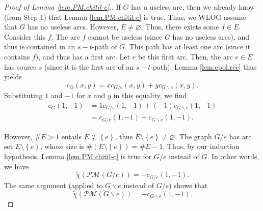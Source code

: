 \documentclass[12pt]{amsart}
\theoremstyle{definition}
\newcommand{\Pm}[1]{\mathcal{PM}\left(#1\right)}
\begin{document}
\begin{proof}[Proof of Lemma \ref{lem.PM.chitil-c}.]
If $G$ has a useless arc, then we already know (from Step 1) that Lemma
\ref{lem.PM.chitil-c} is true. Thus, we WLOG assume that $G$ has no useless
arcs. However, $E\neq\varnothing$. Thus, there exists some $f\in E$. Consider
this $f$. The arc $f$ cannot be useless (since $G$ has no useless arcs), and
thus is contained in an $s-t$-path of $G$. This path has at least one arc
(since it contains $f$), and thus has a first arc. Let $e$ be this first
arc. Then, the arc $e\in E$ has source $s$ (since it is the first arc of an
$s-t$-path). Lemma \ref{lem.cpol.rec} thus yields%
\[
c_{G}\left(  x,y\right)  =xc_{G/e}\left(  x,y\right)  +yc_{G\backslash
e}\left(  x,y\right)  .
\]
Substituting $1$ and $-1$ for $x$ and $y$ in this equality, we find%
\begin{align}
c_{G}\left(  1,-1\right)    & =1c_{G/e}\left(  1,-1\right)  +\left(
-1\right)  c_{G\backslash e}\left(  1,-1\right)  \nonumber\\
& =c_{G/e}\left(  1,-1\right)  -c_{G\backslash e}\left(  1,-1\right)
.\label{pf.lem.PM.chitil-c.c-rec}%
\end{align}


However, $\#E>1$ entails $E\not \subseteq \left\{  e\right\}  $, thus
$E\setminus\left\{  e\right\}  \neq\varnothing$. The graph $G/e$ has arc set
$E\setminus\left\{  e\right\}  $, whose size is $\#\left(  E\setminus\left\{
e\right\}  \right)  =\#E-1$. Thus, by our induction hypothesis, Lemma
\ref{lem.PM.chitil-c} is true for $G/e$ instead of $G$. In other words, we
have%
\begin{equation}
\widetilde{\chi}\left(  \Pm{G/e}\right)  =-c_{G/e}\left(
1,-1\right)  .\label{pf.lem.PM.chitil-c.IH1}%
\end{equation}
The same argument (applied to $G\backslash e$ instead of $G/e$) shows that%
\begin{equation}
\widetilde{\chi}\left(  \Pm{G\backslash e}\right)  =-c_{G\backslash
e}\left(  1,-1\right)  .\label{pf.lem.PM.chitil-c.IH2}%
\end{equation}



\end{proof}
\end{document}

